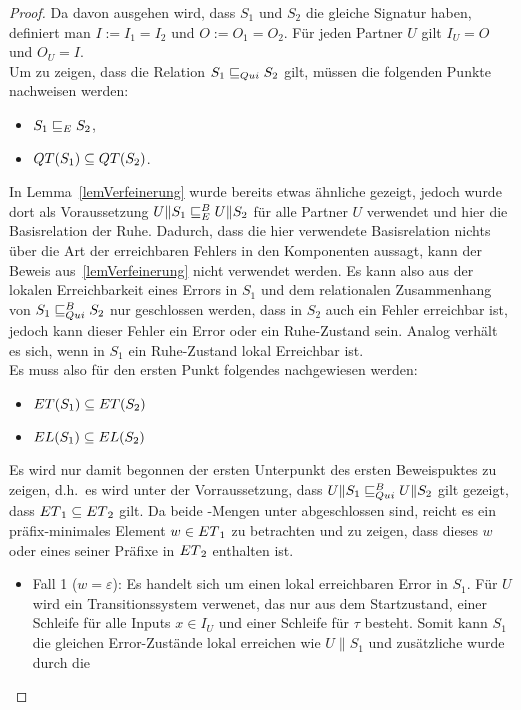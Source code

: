 \begin{proof}
  Da davon ausgehen wird, dass $S_1$ und $S_2$ die gleiche Signatur haben,
  definiert man $I:=I_1=I_2$ und $O:=O_1=O_2$. Für jeden Partner $U$ gilt
  $I_U=O$ und $O_U=I$.\\
  Um zu zeigen, dass die Relation $S_1\sqsubseteq _{Qui} S_2$ gilt, müssen die
  folgenden Punkte nachweisen werden:
  \begin{itemize}
    \item $S_1\sqsubseteq _E S_2$,
    \item $QT{}(S_1)\subseteq QT{}(S_2)$.
  \end{itemize}
  In Lemma~\ref{lemVerfeinerung} wurde bereits etwas ähnliche gezeigt, jedoch
  wurde dort als Voraussetzung $U\|S_1\sqsubseteq _E^B U\|S_2$ für alle Partner $U$
  verwendet und hier die Basisrelation der Ruhe. Dadurch, dass die hier
  verwendete Basisrelation nichts über die Art der erreichbaren Fehlers in den
  Komponenten aussagt, kann der Beweis aus~\ref{lemVerfeinerung} nicht
  verwendet werden. Es kann also aus der lokalen Erreichbarkeit eines Errors in
  $S_1$ und dem relationalen Zusammenhang von $S_1\sqsubseteq _{Qui}^B S_2$ nur geschlossen
  werden, dass in $S_2$ auch ein Fehler erreichbar ist, jedoch kann dieser
  Fehler ein Error oder ein Ruhe-Zustand sein. Analog verhält es sich, wenn in
  $S_1$ ein Ruhe-Zustand lokal Erreichbar ist.\\
  Es muss also für den ersten Punkt folgendes nachgewiesen werden:
  \begin{itemize}
    \item $ET{}(S_1)\subseteq ET{}(S_2)$
    \item $EL{}(S_1)\subseteq EL{}(S_2)$
  \end{itemize}
  Es wird nur damit begonnen der ersten Unterpunkt des ersten Beweispuktes zu
  zeigen, d.h.\ es wird unter der Vorraussetzung, dass $U\|S_1\sqsubseteq _{Qui}^B U\|S_2$
  gilt gezeigt, dass $ET{}_1\subseteq ET{}_2$ gilt. Da beide \ET{}-Mengen
  unter \cont{} abgeschlossen sind, reicht es ein präfix-minimales Element
  $w\in ET{}_1$ zu betrachten und zu zeigen, dass dieses $w$ oder eines seiner
  Präfixe in $ET{}_2$ enthalten ist.
  \begin{itemize}
    \item Fall 1 ($w=\varepsilon$): Es handelt sich um einen lokal erreichbaren
      Error in $S_1$. Für $U$ wird ein Transitionssystem verwenet, das nur aus
      dem Startzustand, einer Schleife für alle Inputs $x\in I_U$ und einer
      Schleife für $\tau$ besteht. Somit kann $S_1$ die gleichen Error-Zustände
      lokal erreichen wie $U\|S_1$ und zusätzliche wurde durch die

\end{itemize}
\end{proof}
